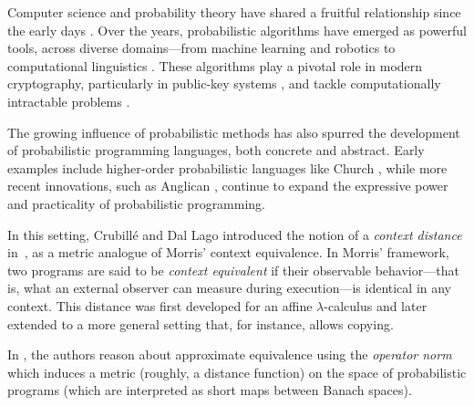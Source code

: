 

Computer science and probability theory have shared a fruitful relationship since the early days \cite{de1956computability}. Over the years, probabilistic algorithms have emerged as powerful tools, across diverse domains—from machine learning \cite{pearl2014}  and robotics \cite{thrun2002robotic} to computational linguistics \cite{manning1999foundations}. These algorithms play a pivotal role in modern cryptography, particularly in public-key systems \cite{goldwasserProbabilisticEncryption1984}, and tackle computationally intractable  problems \cite{motwaniRandomizedAlgorithms1995}.

The growing influence of probabilistic methods has also spurred the development of probabilistic programming languages, both concrete and abstract. Early examples include higher-order probabilistic languages like Church \cite{Church2008}, while more recent innovations, such as Anglican \cite{Anglican2015}, continue to expand the expressive power and practicality of probabilistic programming.


In this setting, Crubillé and Dal Lago introduced the notion of a \emph{context distance} in~\cite{crubilleMetricReasoningLterms2015,crubilleMetricReasoninglambda2017}, as a metric analogue of Morris' context equivalence. In Morris' framework, two programs are said to be \emph{context equivalent} if their observable behavior---that is, 
what an external observer can measure during execution---is identical in any context.  This distance was first developed for an affine $\lambda$-calculus and later extended to a more general 
setting that, for instance, allows copying.

In \cite{dahlqvist2023syntactic}, the authors reason about approximate equivalence using the \emph{operator norm} which induces a metric (roughly, a distance function) on the space of probabilistic programs (which are interpreted as short maps between Banach spaces).




